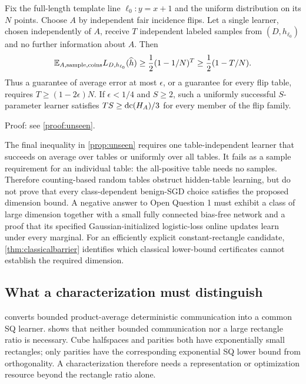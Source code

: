 \begin{proposition}\label{prop:unseen}
Fix the full-length template line $\ell_0:y=x+1$ and the uniform distribution on its $N$ points. Choose $A$ by independent fair incidence flips. Let a single learner, chosen independently of $A$, receive $T$ independent labeled samples from $(D,h_{\ell_0})$ and no further information about $A$. Then
\[
 \mathbb E_{A,\mathrm{sample},\mathrm{coins}}L_{D,h_{\ell_0}}(\widehat h)
 \ge\frac12(1-1/N)^T
 \ge\frac12(1-T/N).
\]
Thus a guarantee of average error at most $\epsilon$, or a guarantee for every flip table, requires $T\ge(1-2\epsilon)N$. If $\epsilon<1/4$ and $S\ge2$, such a uniformly successful $S$-parameter learner satisfies $TS\ge\operatorname{dc}(H_A)/3$ for every member of the flip family.
\end{proposition}

\noindent Proof: see \cref{proof:unseen}.\par



The final inequality in \cref{prop:unseen} requires one table-independent learner that succeeds on average over tables or uniformly over all tables. It fails as a sample requirement for an individual table: the all-positive table needs no samples. Therefore counting-based random tables obstruct hidden-table learning, but do not prove that every class-dependent benign-SGD choice satisfies the proposed dimension bound. A negative answer to Open Question 1 must exhibit a class of large dimension together with a small fully connected bias-free network and a proof that its specified Gaussian-initialized logistic-loss online updates learn under every marginal. For an efficiently explicit constant-rectangle candidate, \cref{thm:classicalbarrier} identifies which classical lower-bound certificates cannot establish the required dimension.

\subsection{What a characterization must distinguish}
 converts bounded product-average deterministic communication into a common SQ learner.  shows that neither bounded communication nor a large rectangle ratio is necessary. Cube halfspaces and parities both have exponentially small rectangles; only parities have the corresponding exponential SQ lower bound from orthogonality. A characterization therefore needs a representation or optimization resource beyond the rectangle ratio alone.

